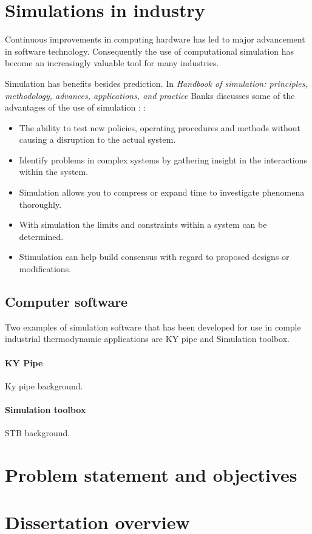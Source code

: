 \section{Simulations in industry}

Continuous improvements in computing hardware has led to major advancement in software technology. Consequently the use of computational simulation has become an increasingly valuable tool for many industries.\cite{kocsis2003integration} \par 

Simulation has benefits besides prediction. In \textit{ Handbook of simulation: principles, methodology, advances, applications, and practice} Banks discusses some of the advantages of the use of simulation : \cite{banks1998handbook}:
\begin{itemize}
	\item The ability to test new policies, operating procedures and methods without causing a disruption to the actual system.
	\item Identify problems in complex systems by gathering insight in the interactions within the system.
	\item Simulation allows you to compress or expand time to investigate phenomena thoroughly.
	\item With simulation the limits and constraints within a system can be determined.
	\item Stimulation can help build consensus with regard to proposed designs or modifications.
\end{itemize}

\subsection{Computer software}
Two examples of simulation software that has been developed for use in comple industrial thermodynamic applications are KY pipe and Simulation toolbox.
\paragraph{KY Pipe}
Ky pipe background. \cite{Wood1993KYPipe}
\paragraph{Simulation toolbox}
STB background.
\section{Problem statement and objectives}
\section{Dissertation overview}